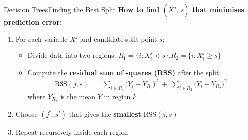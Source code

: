 \documentclass[hyperref={pdfpagelabels=false}]{beamer}
\begin{document}
\begin{frame}{Decision Trees}{Finding the Best Split}
\textbf{How to find $(X^j,\, s)$ that minimises prediction error:}
\vspace{0.2cm}
\begin{enumerate}
  \item For each variable $X^j$ and candidate split point $s$: 
  \vspace{0.15cm}
  \begin{itemize}
    \item Divide data into two regions:
      $R_1=\{i:X^j_i<s\}$,\quad $R_2=\{i:X^j_i\geq s\}$
    \vspace{0.1cm}
    \item Compute the \textbf{residual sum of squares (RSS)} after the split:
    \begin{align*}
      \text{RSS}(j,s) \;=\;
      \sum_{i\in R_1}\!\bigl(Y_i - \bar{Y}_{R_1}\bigr)^2
      \;+\;
      \sum_{i\in R_2}\!\bigl(Y_i - \bar{Y}_{R_2}\bigr)^2
    \end{align*}
    where $\bar{Y}_{R_k}$ is the mean $Y$ in region $k$
  \end{itemize}
  \vspace{0.15cm}
  \item Choose $(j^*, s^*)$ that gives the \textbf{smallest} $\text{RSS}(j,s)$
  \vspace{0.15cm}
  \item Repeat recursively inside each region
\end{enumerate}
\end{frame}
\end{document}
